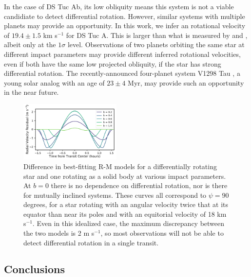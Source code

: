 \documentclass[twocolumn]{aastex63}
\begin{document}
In the case of DS Tuc Ab, its low obliquity means this system is not a viable candidiate to detect differential rotation. 
However, similar systems with multiple planets may provide an opportunity.
In this work, we infer an rotational velocity of $19.4 \pm 1.5$ km s$^{-1}$ for DS Tuc A.
This is larger than what is measured by \citet{Benatti19} and \citet{Newton19}, albeit only at the $1\sigma$ level.
Observations of two planets orbiting the same star at different impact parameters may provide different inferred rotational velocities, even if both have the same low projected obliquity, if the star has strong differential rotation.
The recently-announced four-planet system V1298 Tau \citep{David19}, a young solar analog with an age of $23 \pm 4$ Myr, may provide such an opportunity in the near future.



\begin{figure}[!tbh]
  \begin{center}
    \includegraphics[width=0.45\textwidth, trim={0cm 0.0cm 0cm 0cm}, clip=true]{../figures/diff_rot.pdf}
   \end{center}
  \caption{Difference in best-fitting R-M models for a differentially rotating star and one rotating as a solid body at various impact parameters. At $b=0$ there is no dependence on differential rotation, nor is there for mutually inclined systems. These curves all correspond to $\psi = 90$ degrees, for a star rotating with an angular velocity twice that at its equator than near its poles and with an equitorial velocity of 18 km s$^{-1}$. Even in this idealized case, the maximum discrepancy between the two models is 2 m s$^{-1}$, so most observations will not be able to detect differential rotation in a single transit. }
  \label{fig:diff_rot}
\end{figure}





\subsection{Conclusions}
\end{document}
